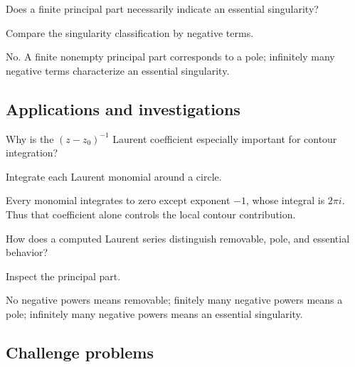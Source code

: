 \begin{exercise}\label{exr:iv08-expand-12}
Does a finite principal part necessarily indicate an essential singularity?
\end{exercise}
\begin{hint}
Compare the singularity classification by negative terms.
\end{hint}
\begin{solution}
No. A finite nonempty principal part corresponds to a pole; infinitely many negative terms characterize an essential singularity.
\end{solution}

\subsection*{Applications and investigations}

\begin{exercise}\label{exr:iv08-expand-13}
Why is the \((z-z_0)^{-1}\) Laurent coefficient especially important for contour integration?
\end{exercise}
\begin{hint}
Integrate each Laurent monomial around a circle.
\end{hint}
\begin{solution}
Every monomial integrates to zero except exponent \(-1\), whose integral is \(2\pi i\). Thus that coefficient alone controls the local contour contribution.
\end{solution}

\begin{exercise}\label{exr:iv08-expand-14}
How does a computed Laurent series distinguish removable, pole, and essential behavior?
\end{exercise}
\begin{hint}
Inspect the principal part.
\end{hint}
\begin{solution}
No negative powers means removable; finitely many negative powers means a pole; infinitely many negative powers means an essential singularity.
\end{solution}

\subsection*{Challenge problems}

